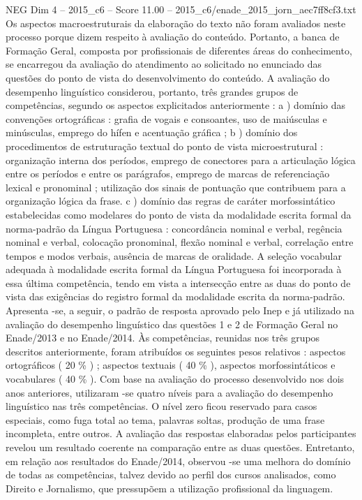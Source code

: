 \begin{textsample}{NEG Dim 4 – 2015\_c6 – Score 11.00 – 2015\_c6/enade\_2015\_jorn\_aec7ff8cf3.txt}
Os aspectos macroestruturais da elaboração do texto não foram avaliados neste processo porque dizem respeito à avaliação do conteúdo.
Portanto, a banca de Formação Geral, composta por profissionais de diferentes áreas do conhecimento, se encarregou da avaliação do atendimento ao solicitado no enunciado das questões do ponto de vista do desenvolvimento do conteúdo.
A avaliação do desempenho linguístico considerou, portanto, três grandes grupos de competências, segundo os aspectos explicitados anteriormente : a ) domínio das convenções ortográficas : grafia de vogais e consoantes, uso de maiúsculas e minúsculas, emprego do hífen e acentuação gráfica ; b ) domínio dos procedimentos de estruturação textual do ponto de vista microestrutural : organização interna dos períodos, emprego de conectores para a articulação lógica entre os períodos e entre os parágrafos, emprego de marcas de referenciação lexical e pronominal ; utilização dos sinais de pontuação que contribuem para a organização lógica da frase. c ) domínio das regras de caráter morfossintático estabelecidas como modelares do ponto de vista da modalidade escrita formal da norma-padrão da Língua Portuguesa : concordância nominal e verbal, regência nominal e verbal, colocação pronominal, flexão nominal e verbal, correlação entre tempos e modos verbais, ausência de marcas de oralidade.
A seleção vocabular adequada à modalidade escrita formal da Língua Portuguesa foi incorporada à essa última competência, tendo em vista a intersecção entre as duas do ponto de vista das exigências do registro formal da modalidade escrita da norma-padrão.
Apresenta -se, a seguir, o padrão de resposta aprovado pelo Inep e já utilizado na avaliação do desempenho linguístico das questões 1 e 2 de Formação Geral no Enade/2013 e no Enade/2014.
Às competências, reunidas nos três grupos descritos anteriormente, foram atribuídos os seguintes pesos relativos : aspectos ortográficos ( 20 \% ) ; aspectos textuais ( 40 \% ), aspectos morfossintáticos e vocabulares ( 40 \% ).
Com base na avaliação do processo desenvolvido nos dois anos anteriores, utilizaram -se quatro níveis para a avaliação do desempenho linguístico nas três competências.
O nível zero ficou reservado para casos especiais, como fuga total ao tema, palavras soltas, produção de uma frase incompleta, entre outros.
A avaliação das respostas elaboradas pelos participantes revelou um resultado coerente na comparação entre as duas questões.
Entretanto, em relação aos resultados do Enade/2014, observou -se uma melhora do domínio de todas as competências, talvez devido ao perfil dos cursos analisados, como Direito e Jornalismo, que pressupõem a utilização profissional da linguagem.

\end{textsample}
